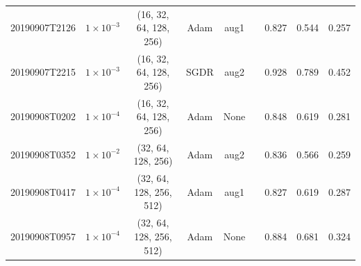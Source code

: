 \begin{table}[!ht]
\begin{adjustbox}{width=\columnwidth, center}
\begin{tabular}{ccccccccc}
			20190907T2126                        & $1\times10^{-3}$                                  & (16, 32, 64, 128, 256)                      & Adam                                & aug1                                                                                      & \xmark                                                                                     & 0.827          & 0.544          & 0.257          \\
			20190907T2215                        & $1\times10^{-3}$                                  & (16, 32, 64, 128, 256)                      & SGDR                                & aug2                                                                                      & \cmark                                                                                     & 0.928          & 0.789          & 0.452          \\
			20190908T0202                        & $1\times10^{-4}$                                 & (16, 32, 64, 128, 256)                      & Adam                                & None                                                                                      & \cmark                                                                                     & 0.848          & 0.619          & 0.281          \\
			20190908T0352                        & $1\times10^{-2}$                                   & (32, 64, 128, 256)                          & Adam                                & aug2                                                                                      & \cmark                                                                                     & 0.836          & 0.566          & 0.259          \\
			20190908T0417                        & $1\times10^{-4}$                                 & (32, 64, 128, 256, 512)                     & Adam                                & aug1                                                                                      & \cmark                                                                                     & 0.827          & 0.619          & 0.287          \\
			20190908T0957                        & $1\times10^{-4}$                                 & (32, 64, 128, 256, 512)                     & Adam                                & None                                                                                      & \xmark                                                                                     & 0.884          & 0.681          & 0.324          \\

\end{tabular}
\end{adjustbox}
\end{table}
